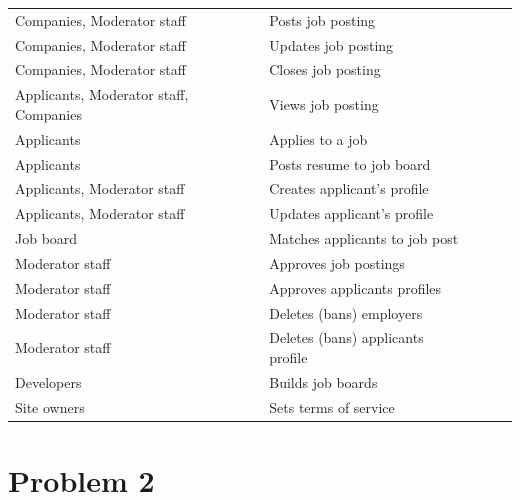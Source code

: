 \documentclass{article}
\begin{document}
\begin{enumerate}[(a)]
\begin{table}[htbp]
\begin{tabular}{lllll}
		Companies, Moderator staff             & Posts job posting                 &  &  &  \\
		Companies, Moderator staff             & Updates job posting               &  &  &  \\
		Companies, Moderator staff             & Closes job posting                &  &  &  \\
		Applicants, Moderator staff, Companies & Views job posting                 &  &  &  \\
		Applicants                             & Applies to a job                  &  &  &  \\
		Applicants                             & Posts resume to job board         &  &  &  \\
		Applicants, Moderator staff            & Creates applicant's profile       &  &  &  \\
		Applicants, Moderator staff            & Updates applicant's profile       &  &  &  \\
		Job board                              & Matches applicants to job post    &  &  &  \\
		Moderator staff                        & Approves job postings             &  &  &  \\
		Moderator staff                        & Approves applicants profiles      &  &  &  \\
		Moderator staff                        & Deletes (bans) employers          &  &  &  \\
		Moderator staff                        & Deletes (bans) applicants profile &  &  &  \\
		Developers                             & Builds job boards                 &  &  &  \\
		Site owners                            & Sets terms of service             &  &  & 
		
	\end{tabular}
\end{table}

\end{enumerate} 

\newpage
\section*{Problem 2}   
\end{document}
